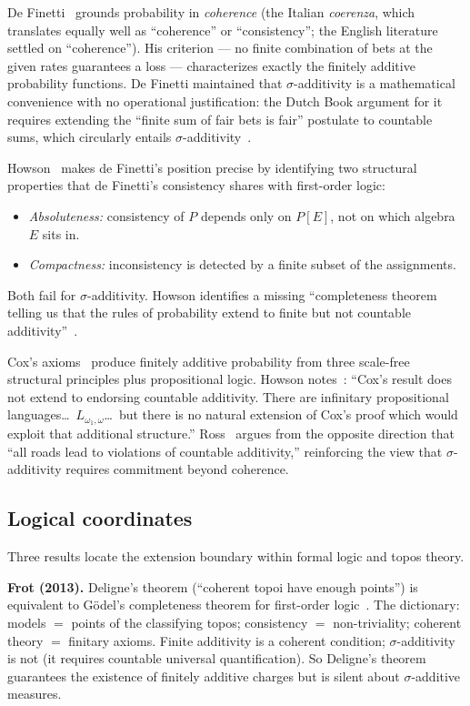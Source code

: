 De Finetti~\cite{deFinetti1974} grounds probability in
\emph{coherence} (the Italian \emph{coerenza}, which translates
equally well as ``coherence'' or ``consistency''; the English
literature settled on ``coherence'').  His criterion ---
no finite combination of bets at the given rates guarantees a
loss --- characterizes exactly the finitely additive probability
functions.  De Finetti maintained that $\sigma$-additivity is a
mathematical convenience with no operational justification: the
Dutch Book argument for it requires extending the ``finite sum of
fair bets is fair'' postulate to countable sums, which circularly
entails $\sigma$-additivity~\cite[\S\S3--4]{Howson2008}.

Howson~\cite{Howson2008} makes de Finetti's position precise by
identifying two structural properties that de Finetti's consistency
shares with first-order logic:
\begin{itemize}[nosep]
  \item \emph{Absoluteness:} consistency of $P$ depends only on
    $P[E]$, not on which algebra $E$ sits in.
  \item \emph{Compactness:} inconsistency is detected by a finite
    subset of the assignments.
\end{itemize}
Both fail for $\sigma$-additivity.  Howson identifies a missing
``completeness theorem telling us that the rules of probability
extend to finite but not countable additivity''~\cite[p.~17]{Howson2008}.

Cox's axioms~\cite{Cox1946} produce finitely additive probability
from three scale-free structural principles plus propositional
logic.  Howson notes~\cite[\S6]{Howson2008}: ``Cox's result does not
extend to endorsing countable additivity.  There are infinitary
propositional languages\ldots\ $L_{\omega_1,\omega}$\ldots\ but
there is no natural extension of Cox's proof which would exploit
that additional structure.''  Ross~\cite{Ross2012} argues from the
opposite direction that ``all roads lead to violations of countable
additivity,'' reinforcing the view that $\sigma$-additivity requires
commitment beyond coherence.

\subsection{Logical coordinates}
\label{sec:logical}

Three results locate the extension boundary within formal logic and
topos theory.

\medskip\noindent
\textbf{Frot (2013).}  Deligne's theorem (``coherent topoi have
enough points'') is equivalent to G\"{o}del's completeness theorem
for first-order logic~\cite{Frot2013}.  The dictionary: models $=$
points of the classifying topos; consistency $=$ non-triviality;
coherent theory $=$ finitary axioms.  Finite additivity is a
coherent condition; $\sigma$-additivity is not (it requires
countable universal quantification).  So Deligne's theorem
guarantees the existence of finitely additive charges but is silent
about $\sigma$-additive measures.

